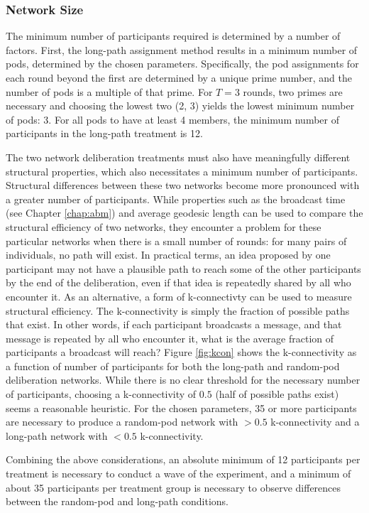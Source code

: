 \subsubsection{Network Size}
The minimum number of participants required is determined by a number of factors.
First, the long-path assignment method results in a minimum number of pods,
determined by the chosen parameters.
Specifically, the pod assignments for each round beyond the first are determined
by a unique prime number,
and the number of pods is a multiple of that prime.
For $T=3$ rounds, two primes are necessary and choosing the lowest two (2, 3)
yields the lowest minimum number of pods: 3.
For all pods to have at least 4 members, the minimum number of participants in
the long-path treatment is 12.

The two network deliberation treatments must also have meaningfully different
structural properties,
which also necessitates a minimum number of participants.
Structural differences between these two networks become more pronounced
with a greater number of participants.
While properties such as the broadcast time (see Chapter \ref{chap:abm})
and average geodesic length can be used to compare the structural efficiency of
two networks,
they encounter a problem for these particular networks
when there is a small number of rounds:
for many pairs of individuals, no path will exist.
In practical terms,
an idea proposed by one participant may not have a plausible
path to reach some of the other participants by the end of the deliberation,
even if that idea is repeatedly shared by all who encounter it.
As an alternative, a form of k-connectivty can be used to measure
structural efficiency.
The k-connectivity is simply the fraction of possible paths that exist.
In other words, if each participant broadcasts a message, and that message is
repeated by all who encounter it, what is the average fraction of participants
a broadcast will reach?
Figure \ref{fig:kcon} shows the k-connectivity as a function of number of
participants for both the long-path and random-pod deliberation networks.
While there is no clear threshold for the necessary number of participants,
choosing a k-connectivity of $0.5$ (half of possible paths exist) seems a
reasonable heuristic.
For the chosen parameters, 35 or more participants are necessary to produce
a random-pod network with $>0.5$ k-connectivity and
a long-path network with $<0.5$ k-connectivity.

Combining the above considerations,
an absolute minimum of 12 participants per treatment is necessary to conduct
a wave of the experiment,
and a minimum of about 35 participants per treatment group is necessary to
observe differences between the random-pod and long-path conditions.

